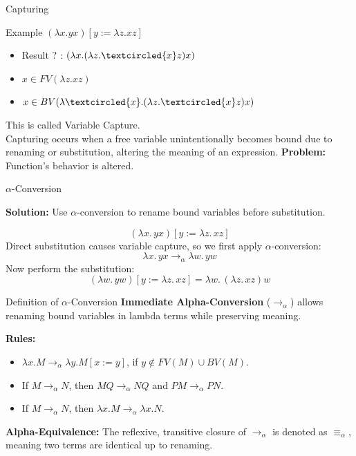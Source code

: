 \documentclass{beamer}
\begin{document}
\begin{frame}{Capturing}
  \begin{block}{Example}
    $(\lambda x.yx)[y := \lambda z.xz]$
  \end{block}
  \begin{itemize}
    \item Result ? : $(\lambda x.(\lambda z.\textcircled{x}z)x)$
    \item $x \in FV(\lambda z.xz)$
    \item $x \in BV(\lambda \textcircled{x}.(\lambda z.\textcircled{x}z)x)$
  \end{itemize}
  This is called Variable Capture.\\
  \vspace{1em}
  Capturing occurs when a free variable unintentionally becomes bound due to renaming or substitution, altering the meaning of an expression.
  \textbf{Problem:} Function's behavior is altered.
\end{frame}
\begin{frame}{$\alpha$-Conversion}
  \begin{block}{}
    \textbf{Solution:} Use $\alpha$-conversion to rename bound variables before substitution.
  \end{block}

    \[
      (\lambda x.\, yx)[y := \lambda z.\, xz]
    \]
    Direct substitution causes variable capture, so we first apply $\alpha$-conversion:
    \[
      \lambda x.\, yx \rightarrow_{\alpha} \lambda w.\, yw
    \]
    Now perform the substitution:
    \[
      (\lambda w.\, yw)[y := \lambda z.\, xz] = \lambda w.\, (\lambda z.\, xz)w
    \]
\end{frame}
\begin{frame}{Definition of $\alpha$-Conversion}
  \textbf{Immediate Alpha-Conversion} ($\rightarrow_{\alpha}$) allows renaming bound variables in lambda terms while preserving meaning.
  
  \vspace{0.5cm}
  \textbf{Rules:}
  \begin{itemize}
      \item $\lambda x. M \rightarrow_{\alpha} \lambda y. M[x := y]$, if $y \notin FV(M) \cup BV(M)$.
      \item If $M \rightarrow_{\alpha} N$, then $MQ \rightarrow_{\alpha} NQ$ and $PM \rightarrow_{\alpha} PN$.
      \item If $M \rightarrow_{\alpha} N$, then $\lambda x. M \rightarrow_{\alpha} \lambda x. N$.
  \end{itemize}
  
  \vspace{0.5cm}
  \textbf{Alpha-Equivalence:} The reflexive, transitive closure of $\rightarrow_{\alpha}$ is denoted as $\equiv_{\alpha}$, meaning two terms are identical up to renaming.
\end{frame}
\end{document}
